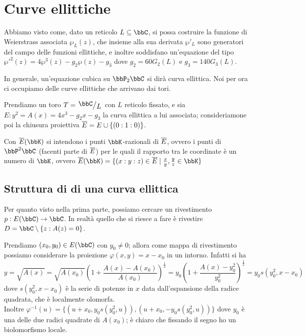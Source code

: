 \chapter{Curve ellittiche}

Abbiamo visto come, dato un reticolo $L \subseteq \bbC$, si possa costruire la funzione di Weierstrass associata $\wp_L (z)$, che insieme alla sua derivata $\wp'_L$ sono generatori del campo delle funzioni ellittiche, e inoltre soddisfano un'equazione del tipo $\wp'^2(z) = 4 \wp^3(z) - g_2 \wp(z) - g_3$ dove $g_2 = 60 G_2(L)$ e $g_3 = 140 G_3(L)$.

In generale, un'equazione cubica su $\bbP_2\bbC$ si dirà curva ellittica. Noi per ora ci occupiamo delle curve ellittiche che arrivano dai tori.

Prendiamo un toro $T=\quotient{\bbC}{L}$ con $L$ reticolo fissato, e sia $E: y^2 = A(x)=4x^3 - g_2 x - g_3$ la curva ellittica a lui associata; consideriamone poi la chiusura proiettiva $\overline{E} = E \cup \{ (0 : 1 : 0)\}$.

\begin{notazione}
  Con $\ol{E}(\bbK)$ si intendono i punti $\bbK$-razionali di $\overline{E}$, ovvero i punti di $\bbP^2 \bbC$ (facenti parte di $\overline{E}$) per le quali il rapporto tra le coordinate è un numero di $\bbK$, ovvero $\ol{E}(\bbK) = \{ (x : y : z) \in \ol{E} \mid \frac{x}{y}, \frac{y}{z} \in \bbK \}$
\end{notazione}

\section{Struttura di \sdR di una curva ellittica}

Per quanto visto nella prima parte, possiamo cercare un rivestimento $p: E(\bbC)\to\bbC$. In realtà quello che si riesce a fare è rivestire $D=\bbC\setminus\{z : A(z)=0\}$.

Prendiamo $(x_0,y_0)\in E(\bbC)$ con $y_0\neq0$; allora come mappa di rivestimento possiamo considerare la proiezione $\varphi(x,y)=x-x_0$ in un intorno. Infatti si ha $$ y=\sqrt{A(x)}=\sqrt{A(x_0)}\left(1+\frac{A(x)-A(x_0)}{A(x_0)} \right)^{\frac12} = y_0\left(1+\frac{A(x)-y_0^2}{y_0^2} \right)^{\frac12} = y_0s(y_0^2,x-x_0)$$
dove $s(y_0^2,x-x_0)$ è la serie di potenze in $x$ data dall'espansione della radice quadrata, che è localmente olomorfa.\\
Inoltre $\varphi^{-1}(u)=\{(u+x_0,y_0s(y_0^2,u)),(u+x_0,-y_0s(y_0^2,u))\}$ dove $y_0$ è una delle due radici quadrate di $A(x_0)$; è chiaro che fissando il segno ho un biolomorfismo locale.

